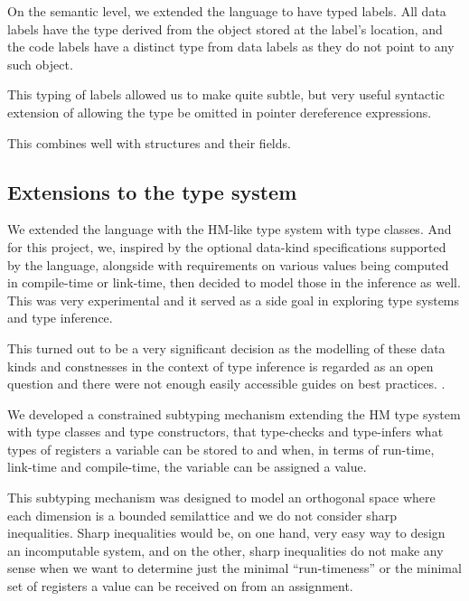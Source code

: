 On the semantic level, we extended the language to have typed labels. All data labels have the type derived from the object stored at the label's location, and the code labels have a distinct type from data labels as they do not point to any such object.

This typing of labels allowed us to make quite subtle, but very useful syntactic extension of allowing the type be omitted in pointer dereference expressions.


This combines well with structures and their fields.



\subsection{Extensions to the type system}

We extended the language with the HM-like type system with type classes. And for this project, we, inspired by the optional data-kind specifications supported by the \cmm language, alongside with requirements on various values being computed in compile-time or link-time, then decided to model those in the inference as well. This was very experimental and it served as a side goal in exploring type systems and type inference.

This turned out to be a very significant decision as the modelling of these data kinds and constnesses in the context of type inference is regarded as an open question and there were not enough easily accessible guides on best practices. .

We developed a constrained subtyping mechanism extending the HM type system with type classes and type constructors, that type-checks and type-infers what types of registers a variable can be stored to and when, in terms of run-time, link-time and compile-time, the variable can be assigned a value.

This subtyping mechanism was designed to model an orthogonal space where each dimension is a bounded semilattice and we do not consider sharp inequalities. Sharp inequalities would be, on one hand, very easy way to design an incomputable system, and on the other, sharp inequalities do not make any sense when we want to determine just the minimal ``run-timeness''  or the minimal set of registers a value can be received on from an assignment.

